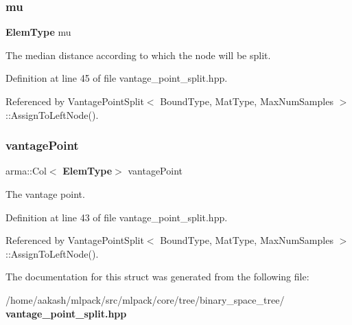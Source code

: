 \subsubsection{mu}
{\footnotesize\ttfamily \textbf{ Elem\+Type} mu}



The median distance according to which the node will be split. 



Definition at line 45 of file vantage\+\_\+point\+\_\+split.\+hpp.



Referenced by Vantage\+Point\+Split$<$ Bound\+Type, Mat\+Type, Max\+Num\+Samples $>$\+::\+Assign\+To\+Left\+Node().

\mbox{\label{structmlpack_1_1tree_1_1VantagePointSplit_1_1SplitInfo_a1e5774bac565e84f45fc10db407fa3ac}} 
\subsubsection{vantage\+Point}
{\footnotesize\ttfamily arma\+::\+Col$<$\textbf{ Elem\+Type}$>$ vantage\+Point}



The vantage point. 



Definition at line 43 of file vantage\+\_\+point\+\_\+split.\+hpp.



Referenced by Vantage\+Point\+Split$<$ Bound\+Type, Mat\+Type, Max\+Num\+Samples $>$\+::\+Assign\+To\+Left\+Node().



The documentation for this struct was generated from the following file\+:\begin{DoxyCompactItemize}
\item 
/home/aakash/mlpack/src/mlpack/core/tree/binary\+\_\+space\+\_\+tree/\textbf{ vantage\+\_\+point\+\_\+split.\+hpp}\end{DoxyCompactItemize}
